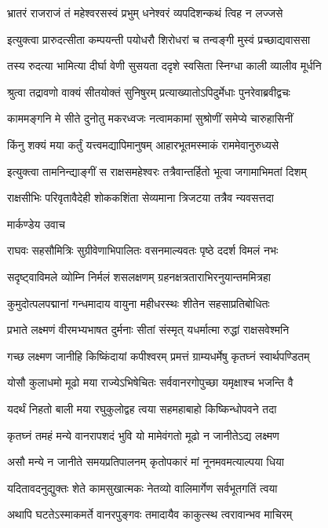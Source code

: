 \twolineshloka
{भ्रातरं राजराजं तं महेश्वरसस्वं प्रभुम्}
{धनेश्वरं व्यपदिशन्कथं त्विह न लज्जसे}


\twolineshloka
{इत्युक्त्वा प्रारुदत्सीता कम्पयन्ती पयोधरौ}
{शिरोधरां च तन्वङ्गी मुस्वं प्रच्छाद्यवाससा}


\twolineshloka
{तस्य रुदत्या भामित्या दीर्घा वेणी सुसयता}
{ददृशे स्वसिता स्निग्धा काली व्यालीव मूर्धनि}


\twolineshloka
{श्रुत्वा तद्रावणो वाक्यं सीतयोक्तं सुनिषुरम्}
{प्रत्याख्यातोऽपिदुर्मेधाः पुनरेवाब्रवीद्वचः}


\twolineshloka
{काममङ्गनि मे सीते दुनोतु मकरध्वजः}
{नत्वामकामां सुश्रोणीं समेप्ये चारुहासिनीं}


\twolineshloka
{किंनु शक्यं मया कर्तुं यत्त्वमद्यापिमानुषम्}
{आहारभूतमस्माकं राममेवानुरुध्यसे}


\twolineshloka
{इत्युक्त्वा तामनिन्द्याङ्गीं स राक्षसमहेश्वरः}
{तत्रैवान्तर्हितो भूत्वा जगामाभिमतां दिशम्}


\twolineshloka
{राक्षसीभिः परिवृतावैदेही शोककशिंता}
{सेव्यमाना त्रिजटया तत्रैव न्यवसत्तदा}


\twolineshloka
{मार्कण्डेय उवाच}
{}


\twolineshloka
{राघवः सहसौमित्रिः सुग्रीवेणाभिपालितः}
{वसनमाल्यवतः पृष्ठे ददर्श विमलं नभः}


\twolineshloka
{सदृष्ट्वाविमले व्योम्नि निर्मलं शसलक्षणम्}
{ग्रहनक्षत्रताराभिरनुयान्तममित्रहा}


\twolineshloka
{कुमुदोत्पलपद्मानां गन्धमादाय वायुना}
{महीधरस्थः शीतेन सहसाप्रतिबोधितः}


\twolineshloka
{प्रभाते लक्ष्मणं वीरमभ्यभाषत दुर्मनाः}
{सीतां संस्मृत् यधर्मात्मा रुद्धां राक्षसवेश्मनि}


\twolineshloka
{गच्छ लक्ष्मण जानीहि किष्किंदायां कपीश्वरम्}
{प्रमत्तं ग्राम्यधर्मेषु कृतघ्नं स्वार्थपण्डितम्}


\twolineshloka
{योसौ कुलाधमो मूढो मया राज्येऽभिषेचितः}
{सर्ववानरगोपुच्छा यमृक्षाश्च भजन्ति वै}


\twolineshloka
{यदर्थं निहतो बाली मया रघुकुलोद्वह}
{त्वया सहमहाबाहो किष्किन्धोपवने तदा}


\twolineshloka
{कृतघ्नं तमहं मन्ये वानरापशदं भुवि}
{यो मामेवंगतो मूढो न जानीतेऽद्य लक्ष्मण}


\twolineshloka
{असौ मन्ये न जानीते समयप्रतिपालनम्}
{कृतोपकारं मां नूनमवमत्याल्पया धिया}


\twolineshloka
{यदितावदनुद्युक्तः शेते कामसुखात्मकः}
{नेतव्यो वालिमार्गेण सर्वभूतगतिं त्वया}


\twolineshloka
{अथापि घटतेऽस्माकमर्ते वानरपुङ्गवः}
{तमादायैव काकुत्स्थ त्वरावान्भव माचिरम्}


